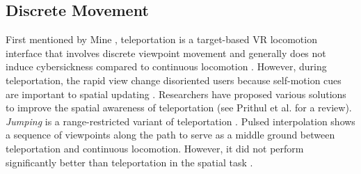 \subsection{Discrete Movement}
First mentioned by Mine \cite{mine_virtual_1995}, teleportation is a target-based VR locomotion interface that involves discrete viewpoint movement and generally does not induce cybersickness compared to continuous locomotion \cite{adhikari_integrating_2022, rahimi_scene_2020, prithul_teleportation_2021, langbehn_evaluation_2018}.
However, during teleportation, the rapid view change disoriented users \cite{bowman_travel_1997} because self-motion cues are important to spatial updating \cite{kelly_teleporting_2020}.
Researchers have proposed various solutions to improve the spatial awareness of teleportation (see Prithul et al. \cite{prithul_teleportation_2021} for a review).
\textit{Jumping} is a range-restricted variant of teleportation \cite{weissker_spatial_2018}. Pulsed interpolation shows a sequence of viewpoints along the path to serve as a middle ground between teleportation and continuous locomotion. However, it did not perform significantly better than teleportation in the spatial task \cite{rahimi_scene_2020}.
